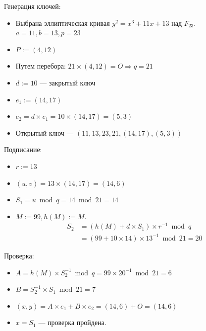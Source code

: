 \documentclass[a4paper, 14pt]{extarticle}
\begin{document}
\begin{enumerate}
    Генерация ключей:
    \begin{itemize}
        \item Выбрана эллиптическая кривая $y^2 = x^3 + 11x + 13$ над $F_{23}$.\\
            $a = 11, b = 13, p = 23$
        \item $P:=(4, 12)$
        \item Путем перебора: $21 \times (4, 12) = O \Rightarrow q = 21$
        \item $d:= 10$ --- закрытый ключ
        \item $e_1 := (14, 17)$
        \item $e_2 = d \times e_1 = 10 \times (14, 17) = (5, 3)$
        \item Открытый ключ --- $(11, 13, 23, 21, (14, 17), (5, 3))$\\
    \end{itemize}

    Подписание:
    \begin{itemize}
        \item $r:= 13$
        \item $(u, v) = 13 \times (14, 17) = (14, 6)$
        \item $S_1 = u \bmod q = 14 \bmod 21 = 14$
        \item $M:=99, h(M) := M$.\\
            \begin{equation*}
                \begin{split}
                    S_2 &= (h(M) + d \times S_1) \times r^{-1} \bmod q \\
                    &= (99 + 10 \times 14) \times 13^{-1} \bmod 21 = 20
                \end{split}
            \end{equation*}
    \end{itemize}

    Проверка:
    \begin{itemize}
        \item $A = h(M) \times S_2^{-1} \bmod q = 99 \times 20^{-1} \bmod 21 = 6$
        \item $B = S_2^{-1} \times S_1 \bmod 21 = 7$
        \item $(x, y) = A \times e_1 + B \times e_2 = (14, 6) + O = (14, 6)$
        \item $x = S_1$ --- проверка пройдена.
    \end{itemize}


\end{enumerate}
\end{document}
